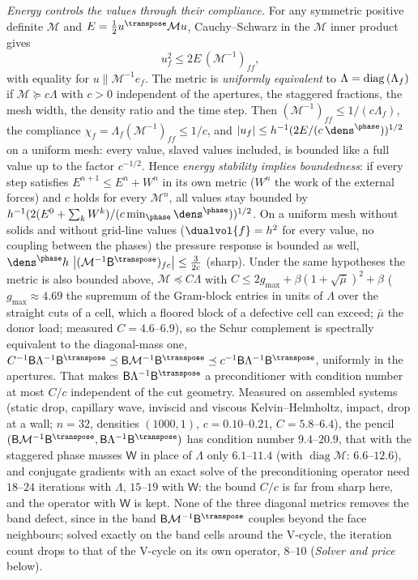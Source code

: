 \emph{Energy controls the values through their compliance.} For any symmetric
positive definite $\mathcal M$ and $E=\tfrac12u^{\transpose}\mathcal Mu$,
Cauchy--Schwarz in the $\mathcal M$ inner product gives
\begin{equation}\label{eq:projection:mimetic-pointwise}
  u_f^2\le2E\,(\mathcal M^{-1})_{ff},
\end{equation}
with equality for $u\parallel\mathcal M^{-1}e_f$. The metric is
\emph{uniformly equivalent} to $\Lambda=\operatorname{diag}\left( \Lambda_f \right)$ if
$\mathcal M\succeq c\Lambda$ with $c>0$ independent of the apertures, the
staggered fractions, the mesh width, the density ratio and the time step.
Then $(\mathcal M^{-1})_{ff}\le1/(c\Lambda_f)$, the compliance
$\chi_f=\Lambda_f(\mathcal M^{-1})_{ff}\le1/c$, and
$\abs{u_f}\le h^{-1}(2E/(c\,\dens^{\phase}))^{1/2}$ on a uniform mesh: every value,
slaved values included, is bounded like a full value up to the factor
$c^{-1/2}$. Hence \emph{energy stability implies boundedness}: if every step
satisfies $E^{n+1}\le E^n+W^n$ in its own metric ($W^n$ the work of the
external forces) and $c$ holds for every $\mathcal M^n$, all values stay
bounded by $h^{-1}(2(E^0+\sum_kW^k)/(c\min_{\phase}\dens^{\phase}))^{1/2}$.
On a uniform mesh without solids and without grid-line values
($\dualvol{f}=h^2$ for every value, no coupling between the phases) the
pressure response is bounded as well,
$\dens^{\phase}h\,\abs{(\mathcal M^{-1}\mathsf B^{\transpose})_{fc}}\le\tfrac{3}{2c}$ (sharp).
Under the same hypotheses the metric is also bounded above,
$\mathcal M\preceq C\Lambda$ with
$C\le2g_{\max}+\beta(1+\sqrt{\bar\mu})^2+\beta$ ($g_{\max}\approx4.69$ the
supremum of the Gram-block entries in units of $\Lambda$ over the straight cuts
of a cell, which a floored block of a defective cell can exceed; $\bar\mu$ the
donor load; measured $C=4.6$--$6.9$), so the Schur complement is spectrally
equivalent to the diagonal-mass one,
$C^{-1}\mathsf B\Lambda^{-1}\mathsf B^{\transpose}\preceq
\mathsf B\mathcal M^{-1}\mathsf B^{\transpose}\preceq c^{-1}\mathsf B\Lambda^{-1}\mathsf B^{\transpose}$,
uniformly in the apertures. That makes $\mathsf B\Lambda^{-1}\mathsf B^{\transpose}$
a preconditioner with condition number at most $C/c$ independent of the cut
geometry. Measured on assembled systems (static drop, capillary wave, inviscid
and viscous Kelvin--Helmholtz, impact, drop at a wall; $n=32$, densities
$(1000,1)$, $c=0.10$--$0.21$, $C=5.8$--$6.4$), the pencil
$(\mathsf B\mathcal M^{-1}\mathsf B^{\transpose},\mathsf B\Lambda^{-1}\mathsf B^{\transpose})$
has condition number $9.4$--$20.9$, that with the staggered phase masses
$\mathsf W$ in place of $\Lambda$ only $6.1$--$11.4$ (with
$\operatorname{diag}\mathcal M$: $6.6$--$12.6$), and conjugate gradients with an
exact solve of the preconditioning operator need $18$--$24$ iterations with
$\Lambda$, $15$--$19$ with $\mathsf W$: the bound $C/c$ is far from sharp
here, and the operator with $\mathsf W$ is kept. None of the three diagonal
metrics removes the band defect, since in the band
$\mathsf B\mathcal M^{-1}\mathsf B^{\transpose}$ couples beyond the face
neighbours; solved exactly on the band cells around
the V-cycle, the iteration count drops to that of the V-cycle on its own
operator, $8$--$10$ (\emph{Solver and price} below).

